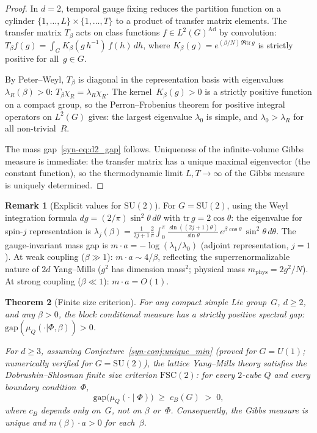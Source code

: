 \documentclass[11pt]{article}
\newtheorem{theorem}{Theorem}[section]
\theoremstyle{definition}
\newtheorem{remark}[theorem]{Remark}
\newcommand{\SU}{\mathrm{SU}}
\newcommand{\tr}{\mathrm{tr}}
\newcommand{\gap}{\mathrm{gap}}
\begin{document}
\begin{proof}
In $d = 2$, temporal gauge fixing reduces the partition
function on a cylinder $\{1,\ldots,L\} \times \{1,\ldots,T\}$
to a product of transfer matrix elements.
The transfer matrix $T_\beta$ acts on class functions
$f \in L^2(G)^{\mathrm{Ad}}$ by convolution:
$T_\beta f(g) = \int_G K_\beta(g\,h^{-1})\,f(h)\,dh$,
where $K_\beta(g) = e^{(\beta/N)\,\Re\tr\,g}$ is strictly
positive for all~$g \in G$.

By Peter--Weyl, $T_\beta$ is diagonal in the representation
basis with eigenvalues $\lambda_R(\beta) > 0$:
$T_\beta \chi_R = \lambda_R \chi_R$.
The kernel~$K_\beta(g) > 0$ is a strictly positive function
on a compact group, so the Perron--Frobenius theorem for
positive integral operators on $L^2(G)$ gives: the largest
eigenvalue $\lambda_0$ is simple, and
$\lambda_0 > \lambda_R$ for all non-trivial~$R$.

The mass gap~\eqref{syn-eq:d2_gap} follows.  Uniqueness of the
infinite-volume Gibbs measure is immediate: the transfer
matrix has a unique maximal eigenvector (the constant
function), so the thermodynamic limit
$L, T \to \infty$ of the Gibbs measure is uniquely
determined.
\end{proof}

\begin{remark}[Explicit values for $\SU(2)$]
\label{syn-rem:d2_explicit}
For $G = \SU(2)$, using the Weyl integration formula
$dg = (2/\pi)\sin^2\theta\,d\theta$ with
$\tr\,g = 2\cos\theta$: the eigenvalue for spin-$j$
representation is
$\lambda_j(\beta) = \frac{1}{2j+1}\frac{2}{\pi}\int_0^\pi
\frac{\sin((2j{+}1)\theta)}{\sin\theta}\,
e^{\beta\cos\theta}\,\sin^2\!\theta\,d\theta$.
The gauge-invariant mass gap is
$m \cdot a = -\log(\lambda_1/\lambda_0)$
(adjoint representation, $j = 1$).
At weak coupling ($\beta \gg 1$):
$m \cdot a \sim 4/\beta$,
reflecting the superrenormalizable nature of $2d$
Yang--Mills ($g^2$ has dimension mass${}^2$;
physical mass $m_{\mathrm{phys}} = 2g^2/N$).
At strong coupling ($\beta \ll 1$): $m \cdot a = O(1)$.
\end{remark}

\begin{theorem}[Finite size criterion]
\label{syn-thm:fsc}
For any compact simple Lie group~$G$, $d \geq 2$, and
any $\beta > 0$,
the block conditional measure has a strictly positive
spectral gap: $\gap(\mu_Q(\cdot|\Phi,\beta)) > 0$.

For $d \geq 3$, assuming
Conjecture~\ref{syn-conj:unique_min}
\textup{(}proved for $G = U(1)$;
numerically verified for $G = \SU(2)$\textup{)},
the lattice Yang--Mills theory satisfies the
Dobrushin--Shlosman finite size criterion $\mathrm{FSC}(2)$:
for every $2$-cube $Q$ and every boundary condition~$\Phi$,
\begin{equation}\label{syn-eq:fsc}
  \gap\!\bigl(\mu_Q(\cdot \mid \Phi)\bigr)
  \;\geq\; c_B(G) \;>\; 0,
\end{equation}
where $c_B$ depends only on~$G$, not on $\beta$ or~$\Phi$.
Consequently, the Gibbs measure is unique and
$m(\beta) \cdot a > 0$ for each~$\beta$.
\end{theorem}
\end{document}
